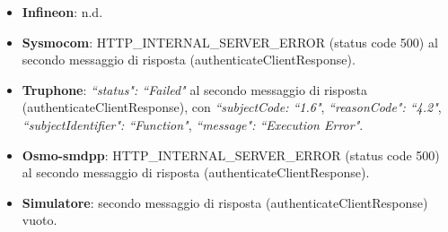 \documentclass[10pt, oneside]{book}
\begin{document}
\begin{itemize}
\item \textbf{Infineon}: n.d.
\item \textbf{Sysmocom}: HTTP\_INTERNAL\_SERVER\_ERROR (status code 500) al secondo messaggio di risposta (authenticateClientResponse).
\item \textbf{Truphone}: \textit{``status": ``Failed"} al secondo messaggio di risposta (authenticateClientResponse), con \textit{``subjectCode: ``1.6"}, \textit{``reasonCode": ``4.2"}, \textit{``subjectIdentifier": ``Function"}, \textit{``message": ``Execution Error"}.
\item \textbf{Osmo-smdpp}: HTTP\_INTERNAL\_SERVER\_ERROR (status code 500) al secondo messaggio di risposta (authenticateClientResponse).
\item \textbf{Simulatore}: secondo messaggio di risposta (authenticateClientResponse) vuoto.
\end{itemize}
\end{document}
